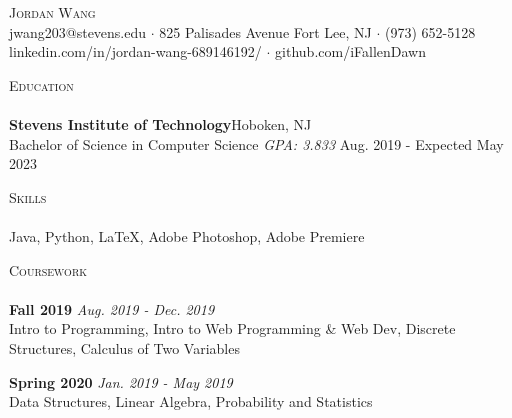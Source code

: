 \documentclass[10pt]{article}
\newcommand{\lineunder} {
    \vspace*{-8pt} \\
    \hspace*{-18pt} \hrulefill \\
}
\newcommand{\header} [1] {
    {\hspace*{-18pt}\vspace*{6pt} \textsc{#1}}
    \vspace*{-6pt} \lineunder
}
\begin{document}
\vspace*{-40pt}

    

\vspace*{2pt}
\begin{center}
	{\Huge \scshape {Jordan Wang}}\\
	jwang203@stevens.edu $\cdot$ 825 Palisades Avenue Fort Lee, NJ $\cdot$ (973) 652-5128 linkedin.com/in/jordan-wang-689146192/ $\cdot$ github.com/iFallenDawn \\
\end{center}

\header{Education}
\textbf{Stevens Institute of Technology}\hfill Hoboken, NJ\\
Bachelor of Science in Computer Science \textit{GPA: 3.833} \hfill Aug. 2019 - Expected May 2023\\
\vspace{2mm}

\header{Skills}
	Java, Python, \LaTeX, Adobe Photoshop, Adobe Premiere                    \\
\vspace{2mm}

\header{Coursework}
{\textbf{Fall 2019}} {\sl Aug. 2019 - Dec. 2019} \hfill 
\\
Intro to Programming, Intro to Web Programming \& Web Dev, Discrete Structures, Calculus of Two Variables\\
\vspace*{2mm}

{\textbf{Spring 2020}} {\sl Jan. 2019 - May 2019} \hfill 
\\
Data Structures, Linear Algebra, Probability and Statistics\\
\vspace*{2mm}
\ 
\end{document}
